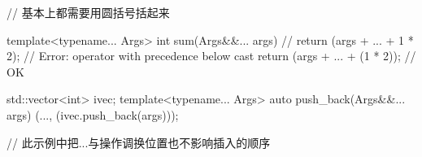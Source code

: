 \begin{cpplst}
// 基本上都需要用圆括号括起来

template<typename... Args>
int sum(Args&&... args)
{
//  return (args + ... + 1 * 2);  
// Error: operator with precedence below cast
    return (args + ... + (1 * 2)); // OK
}
\end{cpplst}

\begin{cpplst}
std::vector<int> ivec{};
template<typename... Args>
auto push_back(Args&&... args)
{
	(..., (ivec.push_back(args)));
}

// 此示例中把...与操作调换位置也不影响插入的顺序
\end{cpplst}

